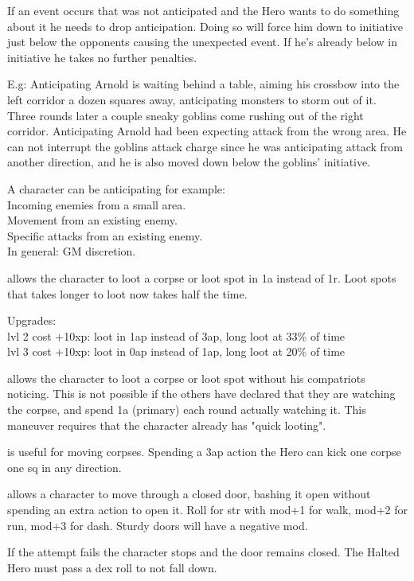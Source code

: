 If an event occurs that was not anticipated and the Hero wants to do something about it he needs to drop anticipation. Doing so will force him down to initiative just below the opponents causing the unexpected event. If he's already below in initiative he takes no further penalties.

E.g: Anticipating Arnold is waiting behind a table, aiming his crossbow into the left corridor a dozen squares away, anticipating monsters to storm out of it. Three rounds later a couple sneaky goblins come rushing out of the right corridor. Anticipating Arnold had been expecting attack from the wrong area. He can not interrupt the goblins attack charge since he was anticipating attack from another direction, and he is also moved down below the goblins' initiative.

A character can be anticipating for example: \\
Incoming enemies from a small area. \\
Movement from an existing enemy. \\
Specific attacks from an existing enemy. \\
In general: GM discretion.


 allows the character to loot a corpse or loot spot in 1a instead of 1r. Loot spots that takes longer to loot now takes half the time.

Upgrades:\\
lvl 2 cost +10xp: loot in 1ap instead of 3ap, long loot at 33\% of time\\
lvl 3 cost +10xp: loot in 0ap instead of 1ap, long loot at 20\% of time


 allows the character to loot a corpse or loot spot without his compatriots noticing. This is not possible if the others have declared that they are watching the corpse, and spend 1a (primary) each round actually watching it. This maneuver requires that the character already has "quick looting".


 is useful for moving corpses. Spending a 3ap action the Hero can kick one corpse one sq in any direction.


 allows a character to move through a closed door, bashing it open without spending an extra action to open it. Roll for str with mod+1 for walk, mod+2 for run, mod+3 for dash. Sturdy doors will have a negative mod.

If the attempt fails the character stops and the door remains closed. The Halted Hero must pass a dex roll to not fall down.




